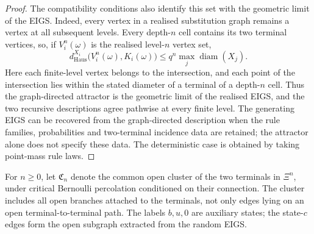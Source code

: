 \begin{proof}
The compatibility conditions also identify this set with the geometric limit of the EIGS.
Indeed, every vertex in a realised substitution graph remains a vertex at all subsequent levels.
Every depth-$n$ cell contains its two terminal vertices, so, if $V_i^n(\omega)$ is the realised level-$n$ vertex set,
\[
 d_{\mathrm{Haus}}^{X_i}
       \bigl(V_i^n(\omega),K_i(\omega)\bigr)
 \le q^n\max_j\operatorname{diam}(X_j).
\]
Here each finite-level vertex belongs to the intersection, and each point of the intersection lies within the stated diameter of a terminal of a depth-$n$ cell.
Thus the graph-directed attractor is the geometric limit of the realised EIGS, and the two recursive descriptions agree pathwise at every finite level.
The generating EIGS can be recovered from the graph-directed description when the rule families, probabilities and two-terminal incidence data are retained; the attractor alone does not specify these data.
The deterministic case is obtained by taking point-mass rule laws.
\end{proof}

For $n\ge0$, let $\mathfrak C_n$ denote the common open cluster of the two terminals in $\Xi^n$, under critical Bernoulli percolation conditioned on their connection.
The cluster includes all open branches attached to the terminals, not only edges lying on an open terminal-to-terminal path.
The labels $b,u,0$ are auxiliary states; the state-$c$ edges form the open subgraph extracted from the random EIGS.

